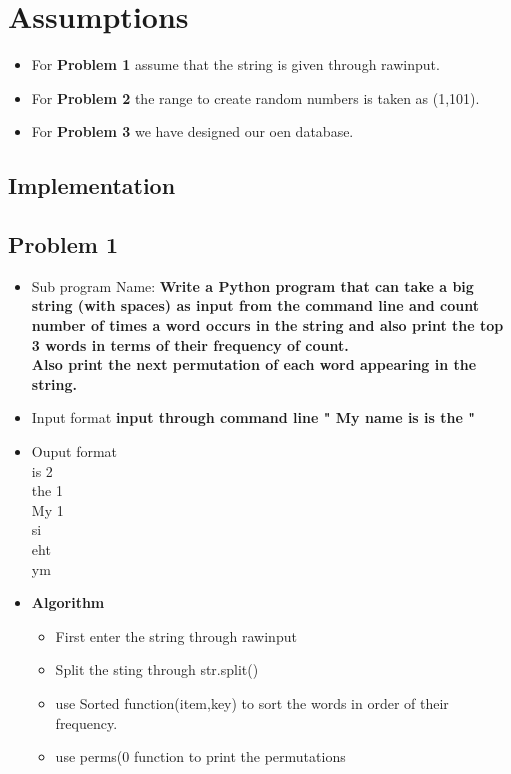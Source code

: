 \documentclass[12pt,a4paper]{article}
\begin{document}
{{{\centering



\newpage
\centering
\newpage
\section{Assumptions}
 
\begin{itemize}
\item{For \textbf{Problem 1} assume that the string is given through rawinput.}
\item{For \textbf{Problem 2} the range to create random numbers is taken as (1,101).}
\item{For \textbf{Problem 3} we have designed our oen database.}
\end{itemize}

\newpage

\flushleft
\begin{center}


\section{Implementation}
\end{center}
\subsection{Problem 1}
\begin{itemize}
\item{Sub program Name:}
\textbf{Write a Python program that can take a big string (with spaces) as input from the command line and count number of times a word occurs in the string and also print the top 3 words in terms of their frequency of count.\\
Also print the next permutation of each word appearing in the string.}


\item{Input format}
\textbf{ input through command line " My name is is the "
}


\item{Ouput format}\\
is 2\\
the 1\\
My 1\\
si\\ eht\\ym\\





\item{\textbf{Algorithm}}
\begin{itemize}
\item First enter the string through rawinput
\item Split the sting through str.split()
\item use Sorted function(item,key) to sort the words in order of their frequency.
\item use perms(0 function to print the permutations



\end{itemize}
\end{itemize}}}}
\end{document}
